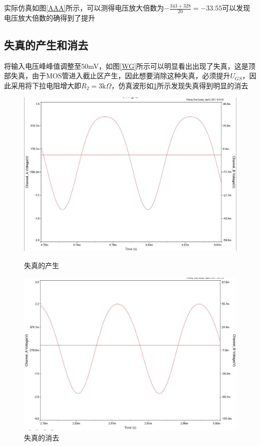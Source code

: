 \documentclass[UTF8,a4paper]{ctexart}
\begin{document}
实际仿真如图\ref{AAA}所示，可以测得电压放大倍数为$-\frac{343+328}{20}=-33.55$可以发现电压放大倍数的确得到了提升
\subsection{失真的产生和消去}
将输入电压峰峰值调整至50mV，如图\ref{WG}所示可以明显看出出现了失真，这是顶部失真，由于MOS管进入截止区产生，因此想要消除这种失真，必须提升$U_{GS}$，因此采用将下拉电阻增大即$R_2=3\mathrm{k}\Omega$，仿真波形如\ref{FG}所示发现失真得到明显的消去

\begin{figure}
\centering
\includegraphics[width=\textwidth]{2-5W.jpg}
\caption{失真的产生}
\label{WG}
\includegraphics[width=\textwidth]{2-5F.jpg}
\caption{失真的消去}
\label{FG}
\end{figure}
\end{document}
